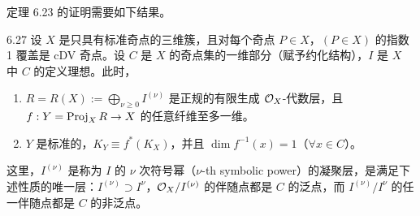 定理 6.23 的证明需要如下结果。

\begin{theoremp}[{[Rei83b]}]{6.27}
设 $X$ 是只具有标准奇点的三维簇，且对每个奇点 $P\in X$，$(P\in X)$ 的指数 1 覆盖是 cDV 奇点。设 $C$ 是 $X$ 的奇点集的一维部分（赋予约化结构），$I$ 是 $X$ 中 $C$ 的定义理想。此时，
\begin{enumerate}[label=（\arabic*）,leftmargin=3.2em]
\item $R=R(X):=\bigoplus_{\nu\ge0}I^{(\nu)}$ 是正规的有限生成 $\mathcal{O}_X$-代数层，且 $f:Y=\operatorname{Proj}_X R\to X$ 的任意纤维至多一维。
\item $Y$ 是标准的，$K_Y\equiv f^*(K_X)$，并且 $\dim f^{-1}(x)=1$（$\forall x\in C$）。
\end{enumerate}
\end{theoremp}


这里，$I^{(\nu)}$ 是称为 $I$ 的 $\nu$ 次符号幂（$\nu$-th symbolic power）的凝聚层，是满足下述性质的唯一层：$I^{(\nu)}\supset I^{\nu}$，$\mathcal{O}_X/I^{(\nu)}$ 的伴随点都是 $C$ 的泛点，而 $I^{(\nu)}/I^{\nu}$ 的任一伴随点都是 $C$ 的非泛点。

